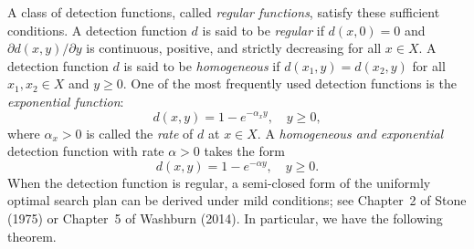 \documentclass[12pt]{article}
\theoremstyle{plain}
\theoremstyle{definition}
\theoremstyle{remark}
\begin{document}
A class of detection functions,  called \emph{regular functions}, satisfy these sufficient conditions.  A detection function $d$ is said to be \emph{regular} if $d(x, 0)=0$ and $\partial d(x, y)/\partial y$ is continuous, positive, and strictly decreasing for all $x\in X$.  A detection function $d$ is said to be \emph{homogeneous} if $d(x_1, y)=d(x_2,y)$ for all $x_1, x_2\in X$ and $y\geq 0$.  One of the most frequently used detection functions is the \emph{exponential function}:
\[d(x, y)=1-e^{-\alpha_xy}, \quad  y\geq 0,\]
where  $\alpha_x>0$  is called the \emph{rate} of $d$ at $x\in X$. A \emph{homogeneous and exponential} detection function  with rate $\alpha>0$ takes the form
 \[d(x, y)=1-e^{-\alpha y}, \quad y\geq 0.\]
When the detection function is regular,  a semi-closed form of the uniformly optimal search plan can be derived under mild conditions; see Chapter~2 of Stone (1975) or Chapter~5 of Washburn (2014).  In particular, we have the following theorem. 
\end{document}
